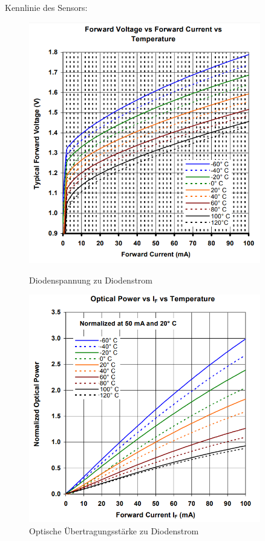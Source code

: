 Kennlinie des Sensors:

\begin{figure}[H]
  \begin{minipage}[hbt]{0.45\textwidth}
    \includegraphics[width=0.9\textwidth]{Bilder/Kennlinien/Sens_Vf_If}
 	\caption{Diodenspannung zu Diodenstrom}
  	\label{Sens_vf_if}
  \end{minipage}
\hspace{.03\linewidth}
  \begin{minipage}[hbt]{0.45\textwidth}
    \includegraphics[width=0.9\textwidth]{Bilder/Kennlinien/Sens_op_If}
  	\caption{Optische Übertragungsstärke zu Diodenstrom}
  	\label{Sens_op_if}
  \end{minipage}
\end{figure}

